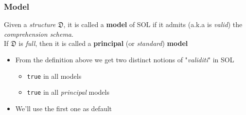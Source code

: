 \documentclass{beamer}
\begin{document}
                \begin{frame}
                    \frametitle{Model}
                    \begin{definition}
                        Given a \textit{structure} $ \mathfrak{D} $, it is called a \textbf{model} of SOL if it admits (a.k.a is \textit{valid}) the \textit{comprehension schema}.\\
                        If $ \mathfrak{D} $ is \textit{full}, then it is called a \textbf{principal} (or \textit{standard}) \textbf{model}
                    \end{definition}
                    \begin{itemize}
                        \item From the definition above we get two distinct notions of "\textit{validiti}" in SOL
                              \begin{itemize}
                                \item \texttt{true} in all models
                                \item \texttt{true} in all \textit{principal} models
                              \end{itemize}
                        \item We'll use the first one as default
                    \end{itemize}
                \end{frame}
\end{document}
